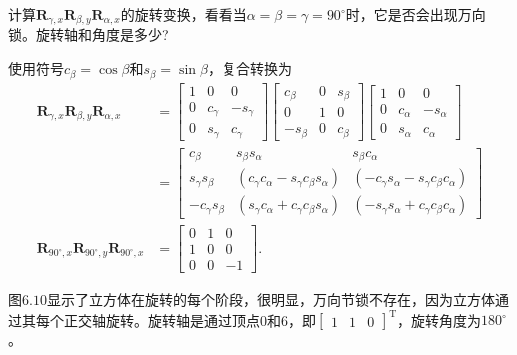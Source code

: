 \begin{example}
    计算$\mathbf{R}_{\gamma, x} \mathbf{R}_{\beta, y} \mathbf{R}_{\alpha, x}$的旋转变换，看看当$\alpha=\beta=\gamma=90^{\circ}$时，它是否会出现万向锁。旋转轴和角度是多少?
    
    使用符号$c_{\beta}=\cos \beta$和$s_{\beta}=\sin \beta$，复合转换为
    $$
    \begin{aligned}
    \mathbf{R}_{\gamma, x} \mathbf{R}_{\beta, y} \mathbf{R}_{\alpha, x} & =\left[\begin{array}{ccc}
    1 & 0 & 0 \\
    0 & c_{\gamma} & -s_{\gamma} \\
    0 & s_{\gamma} & c_{\gamma}
    \end{array}\right]\left[\begin{array}{ccc}
    c_{\beta} & 0 & s_{\beta} \\
    0 & 1 & 0 \\
    -s_{\beta} & 0 & c_{\beta}
    \end{array}\right]\left[\begin{array}{ccc}
    1 & 0 & 0 \\
    0 & c_{\alpha} & -s_{\alpha} \\
    0 & s_{\alpha} & c_{\alpha}
    \end{array}\right] \\
    & =\left[\begin{array}{ccc}
    c_{\beta} & s_{\beta} s_{\alpha} & s_{\beta} c_{\alpha} \\
    s_{\gamma} s_{\beta} & \left(c_{\gamma} c_{\alpha}-s_{\gamma} c_{\beta} s_{\alpha}\right) & \left(-c_{\gamma} s_{\alpha}-s_{\gamma} c_{\beta} c_{\alpha}\right) \\
    -c_{\gamma} s_{\beta} & \left(s_{\gamma} c_{\alpha}+c_{\gamma} c_{\beta} s_{\alpha}\right) & \left(-s_{\gamma} s_{\alpha}+c_{\gamma} c_{\beta} c_{\alpha}\right)
    \end{array}\right] \\
    \mathbf{R}_{90^{\circ}, x} \mathbf{R}_{90^{\circ}, y} \mathbf{R}_{90^{\circ}, x} & =\left[\begin{array}{ccc}
    0 & 1 & 0 \\
    1 & 0 & 0 \\
    0 & 0 & -1
    \end{array}\right] .
    \end{aligned}
    $$
    
    图$6.10$显示了立方体在旋转的每个阶段，很明显，万向节锁不存在，因为立方体通过其每个正交轴旋转。旋转轴是通过顶点0和6，即$\left[\begin{array}{lll}1 & 1 & 0\end{array}\right]^{\mathrm{T}}$，旋转角度为$180^{\circ}$。
    

\end{example}
